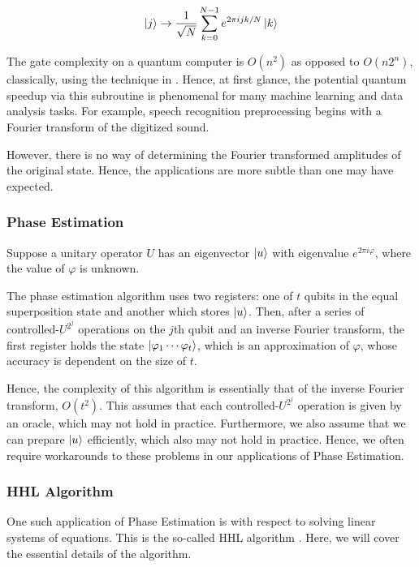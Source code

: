 \documentclass[12]{amsart}
\newcommand\0{\mathbf{0}}
\newcommand\<{\langle}
\renewcommand\>{\rangle}
\renewcommand\phi{\varphi}
\begin{document}
\begin{align*}
\ket{j} \rightarrow \frac{1}{\sqrt{N}} \sum_{k=0}^{N-1} e^{2\pi i jk / N} \ket{k}	
\end{align*}

The gate complexity on a quantum computer is $O(n^2)$ as opposed to $O(n2^n)$, classically, using the technique in \cite{nielsen2010quantum}. Hence, at first glance, the potential quantum speedup via this subroutine is phenomenal for many machine learning and data analysis tasks. For example, speech recognition preprocessing begins with a Fourier transform of the digitized sound. 

However, there is no way of determining the Fourier transformed amplitudes of the original state. Hence, the applications are more subtle than one may have expected.

\subsubsection{Phase Estimation}

Suppose a unitary operator $U$ has an eigenvector $\ket{u}$ with eigenvalue $e^{2\pi i \phi}$, where the value of $\phi$ is unknown. 

The phase estimation algorithm uses two registers: one of $t$ qubits in the equal superposition state and another which stores $\ket{u}$. Then, after a series of controlled-$U^{2^j}$ operations on the $j$th qubit and an inverse Fourier transform, the first register holds the state $\ket{\phi_1 \cdots \phi_t}$, which is an approximation of $\phi$, whose accuracy is dependent on the size of $t$. 

Hence, the complexity of this algorithm is essentially that of the inverse Fourier transform, $O(t^2)$. This assumes that each controlled-$U^{2^j}$ operation is given by an oracle, which may not hold in practice. Furthermore, we also assume that we can prepare $\ket{u}$ efficiently, which also may not hold in practice. Hence, we often require workarounds to these problems in our applications of Phase Estimation.

\subsubsection{HHL Algorithm}

One such application of Phase Estimation is with respect to solving linear systems of equations. This is the so-called HHL algorithm \cite{lloyd2010quantum}. Here, we will cover the essential details of the algorithm.
\end{document}
